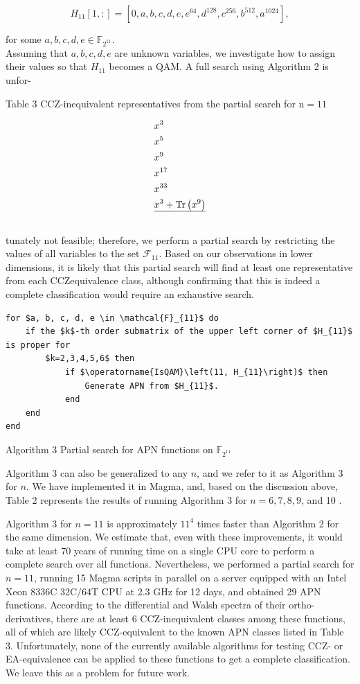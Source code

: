 \documentclass[10pt]{article}
\begin{document}
$$
H_{11}[1,:]=\left[0, a, b, c, d, e, e^{64}, d^{128}, c^{256}, b^{512}, a^{1024}\right],
$$

for some $a, b, c, d, e \in \mathbb{F}_{2^{11}}$.\\
Assuming that $a, b, c, d, e$ are unknown variables, we investigate how to assign their values so that $H_{11}$ becomes a QAM. A full search using Algorithm 2 is unfor-

Table 3 CCZ-inequivalent representatives from the partial search for $\mathrm{n}=11$

$$
\begin{aligned}
& x^{3} \\
& x^{5} \\
& x^{9} \\
& x^{17} \\
& x^{33} \\
& x^{3}+\operatorname{Tr}\left(x^{9}\right) \\
\hline &
\end{aligned}
$$

tunately not feasible; therefore, we perform a partial search by restricting the values of all variables to the set $\mathcal{F}_{11}$. Based on our observations in lower dimensions, it is likely that this partial search will find at least one representative from each CCZequivalence class, although confirming that this is indeed a complete classification would require an exhaustive search.

\begin{verbatim}
for $a, b, c, d, e \in \mathcal{F}_{11}$ do
    if the $k$-th order submatrix of the upper left corner of $H_{11}$ is proper for
        $k=2,3,4,5,6$ then
            if $\operatorname{IsQAM}\left(11, H_{11}\right)$ then
                Generate APN from $H_{11}$.
            end
    end
end
\end{verbatim}

Algorithm 3 Partial search for APN functions on $\mathbb{F}_{2^{11}}$

Algorithm 3 can also be generalized to any $n$, and we refer to it as Algorithm 3 for $n$. We have implemented it in Magma, and, based on the discussion above, Table 2 represents the results of running Algorithm 3 for $n=6,7,8,9$, and 10 .

Algorithm 3 for $n=11$ is approximately $11^{4}$ times faster than Algorithm 2 for the same dimension. We estimate that, even with these improvements, it would take at least 70 years of running time on a single CPU core to perform a complete search over all functions. Nevertheless, we performed a partial search for $n=11$, running 15 Magma scripts in parallel on a server equipped with an Intel Xeon 8336C 32C/64T CPU at 2.3 GHz for 12 days, and obtained 29 APN functions. According to the differential and Walsh spectra of their ortho-derivatives, there are at least 6 CCZ-inequivalent classes among these functions, all of which are likely CCZ-equivalent to the known APN classes listed in Table 3. Unfortunately, none of the currently available algorithms for testing CCZ- or EA-equivalence can be applied to these functions to get a complete classification. We leave this as a problem for future work.
\end{document}
